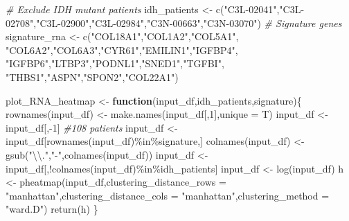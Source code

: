 \documentclass[
]{article}
\newenvironment{Shaded}{\begin{snugshade}}{\end{snugshade}}
\newcommand{\AttributeTok}[1]{\textcolor[rgb]{0.77,0.63,0.00}{#1}}
\newcommand{\CommentTok}[1]{\textcolor[rgb]{0.56,0.35,0.01}{\textit{#1}}}
\newcommand{\ControlFlowTok}[1]{\textcolor[rgb]{0.13,0.29,0.53}{\textbf{#1}}}
\newcommand{\DecValTok}[1]{\textcolor[rgb]{0.00,0.00,0.81}{#1}}
\newcommand{\FunctionTok}[1]{\textcolor[rgb]{0.00,0.00,0.00}{#1}}
\newcommand{\NormalTok}[1]{#1}
\newcommand{\OtherTok}[1]{\textcolor[rgb]{0.56,0.35,0.01}{#1}}
\newcommand{\SpecialCharTok}[1]{\textcolor[rgb]{0.00,0.00,0.00}{#1}}
\newcommand{\StringTok}[1]{\textcolor[rgb]{0.31,0.60,0.02}{#1}}
\begin{document}
\begin{Shaded}
\begin{Highlighting}[]
\CommentTok{\# Exclude IDH mutant patients}
\NormalTok{idh\_patients }\OtherTok{\textless{}{-}} \FunctionTok{c}\NormalTok{(}\StringTok{"C3L{-}02041"}\NormalTok{,}\StringTok{"C3L{-}02708"}\NormalTok{,}\StringTok{"C3L{-}02900"}\NormalTok{,}\StringTok{"C3L{-}02984"}\NormalTok{,}\StringTok{"C3N{-}00663"}\NormalTok{,}\StringTok{"C3N{-}03070"}\NormalTok{)}
\CommentTok{\# Signature genes}
\NormalTok{signature\_rna }\OtherTok{\textless{}{-}} \FunctionTok{c}\NormalTok{(}\StringTok{"COL18A1"}\NormalTok{,}\StringTok{"COL1A2"}\NormalTok{,}\StringTok{"COL5A1"}\NormalTok{,}
               \StringTok{"COL6A2"}\NormalTok{,}\StringTok{"COL6A3"}\NormalTok{,}\StringTok{"CYR61"}\NormalTok{,}\StringTok{"EMILIN1"}\NormalTok{,}\StringTok{"IGFBP4"}\NormalTok{,}
               \StringTok{"IGFBP6"}\NormalTok{,}\StringTok{"LTBP3"}\NormalTok{,}\StringTok{"PODNL1"}\NormalTok{,}\StringTok{"SNED1"}\NormalTok{,}\StringTok{"TGFBI"}\NormalTok{,}
               \StringTok{"THBS1"}\NormalTok{,}\StringTok{"ASPN"}\NormalTok{,}\StringTok{"SPON2"}\NormalTok{,}\StringTok{"COL22A1"}\NormalTok{)}
\end{Highlighting}
\end{Shaded}

\begin{Shaded}
\begin{Highlighting}[]
\NormalTok{plot\_RNA\_heatmap }\OtherTok{\textless{}{-}} \ControlFlowTok{function}\NormalTok{(input\_df,idh\_patients,signature)\{}
  \FunctionTok{rownames}\NormalTok{(input\_df) }\OtherTok{\textless{}{-}} \FunctionTok{make.names}\NormalTok{(input\_df[,}\DecValTok{1}\NormalTok{],}\AttributeTok{unique =}\NormalTok{ T)}
\NormalTok{  input\_df }\OtherTok{\textless{}{-}}\NormalTok{ input\_df[,}\SpecialCharTok{{-}}\DecValTok{1}\NormalTok{] }\CommentTok{\#108 patients}
\NormalTok{  input\_df }\OtherTok{\textless{}{-}}\NormalTok{ input\_df[}\FunctionTok{rownames}\NormalTok{(input\_df)}\SpecialCharTok{\%in\%}\NormalTok{signature,]}
  \FunctionTok{colnames}\NormalTok{(input\_df) }\OtherTok{\textless{}{-}} \FunctionTok{gsub}\NormalTok{(}\StringTok{"}\SpecialCharTok{\textbackslash{}\textbackslash{}}\StringTok{."}\NormalTok{,}\StringTok{"{-}"}\NormalTok{,}\FunctionTok{colnames}\NormalTok{(input\_df))}
\NormalTok{  input\_df }\OtherTok{\textless{}{-}}\NormalTok{ input\_df[,}\SpecialCharTok{!}\FunctionTok{colnames}\NormalTok{(input\_df)}\SpecialCharTok{\%in\%}\NormalTok{idh\_patients]}
\NormalTok{  input\_df }\OtherTok{\textless{}{-}} \FunctionTok{log}\NormalTok{(input\_df)}
\NormalTok{  h }\OtherTok{\textless{}{-}} \FunctionTok{pheatmap}\NormalTok{(input\_df,}\AttributeTok{clustering\_distance\_rows =} \StringTok{"manhattan"}\NormalTok{,}\AttributeTok{clustering\_distance\_cols  =} \StringTok{"manhattan"}\NormalTok{,}\AttributeTok{clustering\_method =} \StringTok{"ward.D"}\NormalTok{)}
  \FunctionTok{return}\NormalTok{(h)}
\NormalTok{\}}
\end{Highlighting}
\end{Shaded}
\end{document}
